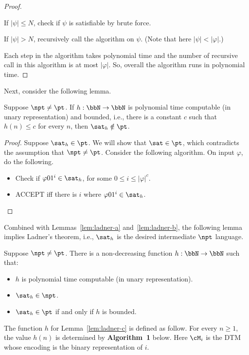 \documentclass[11pt, a4paper]{article}
\begin{document}
\begin{proof}
\begin{itemize}
If $|\psi|\leq N$, check if $\psi$ is satisfiable by brute force.

If $|\psi|> N$, recursively call the algorithm on $\psi$. (Note that here $|\psi|< |\varphi|$.)

\end{itemize}
Each step in the algorithm takes polynomial time and the number of recursive call in this algorithm is at most $|\varphi|$.
So, overall the algorithm runs in polynomial time.
\end{proof}

Next, consider the following lemma.
\begin{lemma}
\label{lem:ladner-b}
Suppose $\npt\neq \pt$.
If $h:\bbN\to\bbN$ is polynomial time computable (in unary representation)
and bounded, i.e., there is a constant $c$ such that $h(n)\leq c$ for every $n$,
then $\sat_h\notin\pt$.
\end{lemma}
\begin{proof}
Suppose $\sat_h\in \pt$.
We will show that $\sat\in \pt$, which contradicts the assumption that $\npt\neq \pt$.
Consider the following algorithm.
On input $\varphi$, do the following.
\begin{itemize}\itemsep=0pt
\item 
Check if $\varphi01^{i} \in \sat_h$, for some $0\leq i \leq |\varphi|^c$.
\item
ACCEPT iff there is $i$ where $\varphi01^{i} \in \sat_h$.
\end{itemize}
\end{proof}

Combined with Lemmas~\ref{lem:ladner-a} and~\ref{lem:ladner-b},
the following lemma implies Ladner's theorem, i.e., $\sat_h$ is the desired intermediate $\npt$ language.
\begin{lemma}
\label{lem:ladner-c}
Suppose $\npt\neq \pt$.
There is a non-decreasing function $h:\bbN\to\bbN$ such that:
\begin{itemize}\itemsep=0pt
\item 
$h$ is polynomial time computable (in unary representation).
\item
$\sat_h \in \npt$.
\item
$\sat_h \in \pt$ if and only if $h$ is bounded.
\end{itemize}
\end{lemma}


The function $h$ for Lemma~\ref{lem:ladner-c}
is defined as follow.
For every $n\geq 1$, the value $h(n)$ is determined by {\bf Algorithm~1} below.
Here $\cM_i$ is the DTM whose encoding is the binary representation of $i$.
\end{document}
